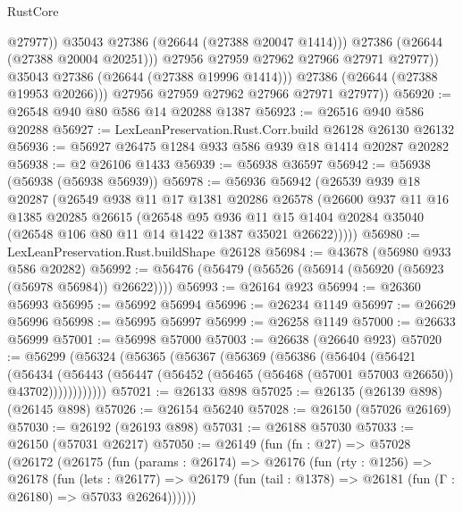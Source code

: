 \begin{lexlean}{RustCore}
\begin{coremodule}
                        @27977))
                    @35043
                    @27386
                    (@26644 (@27388 @20047 @1414)))
                  @27386
                  (@26644 (@27388 @20004 @20251)))
                @27956
                @27959
                @27962
                @27966
                @27971
                @27977))
            @35043
            @27386
            (@26644 (@27388 @19996 @1414)))
          @27386
          (@26644 (@27388 @19953 @20266)))
        @27956
        @27959
        @27962
        @27966
        @27971
        @27977))
@56920 := @26548 @940 @80 @586 @14 @20288 @1387
@56923 := @26516 @940 @586 @20288
@56927 := LexLeanPreservation.Rust.Corr.build @26128 @26130 @26132
@56936 := @56927 @26475 @1284 @933 @586 @939 @18 @1414 @20287 @20282
@56938 := @2 @26106 @1433
@56939 := @56938 @36597
@56942 := @56938 (@56938 (@56938 @56939))
@56978 := @56936
    @56942
    (@26539
      @939
      @18
      @20287
      (@26549
        @938
        @11
        @17
        @1381
        @20286
        @26578
        (@26600
          @937
          @11
          @16
          @1385
          @20285
          @26615
          (@26548
            @95
            @936
            @11
            @15
            @1404
            @20284
            @35040
            (@26548 @106 @80 @11 @14 @1422 @1387 @35021 @26622)))))
@56980 := LexLeanPreservation.Rust.buildShape @26128
@56984 := @43678 (@56980 @933 @586 @20282)
@56992 := @56476 (@56479 (@56526 (@56914 (@56920 (@56923 (@56978 @56984)) @26622))))
@56993 := @26164 @923
@56994 := @26360 @56993
@56995 := @56992 @56994
@56996 := @26234 @1149
@56997 := @26629 @56996
@56998 := @56995 @56997
@56999 := @26258 @1149
@57000 := @26633 @56999
@57001 := @56998 @57000
@57003 := @26638 (@26640 @923)
@57020 := @56299
    (@56324
      (@56365
        (@56367
          (@56369
            (@56386
              (@56404
                (@56421
                  (@56434
                    (@56443
                      (@56447 (@56452 (@56465 (@56468 (@57001 @57003 @26650)) @43702))))))))))))
@57021 := @26133 @898
@57025 := @26135 (@26139 @898) (@26145 @898)
@57026 := @26154 @56240
@57028 := @26150 (@57026 @26169)
@57030 := @26192 (@26193 @898)
@57031 := @26188 @57030
@57033 := @26150 (@57031 @26217)
@57050 := @26149
    (fun (fn : @27) =>
    @57028
      (@26172
        (@26175
          (fun (params : @26174) =>
          @26176
            (fun (rty : @1256) =>
            @26178
              (fun (lets : @26177) =>
              @26179 (fun (tail : @1378) => @26181 (fun (Γ : @26180) => @57033 @26264))))))

\end{coremodule}
\end{lexlean}
